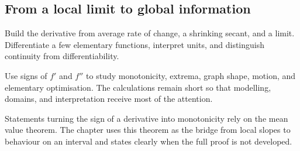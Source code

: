 \subsection{From a local limit to global information}

\begin{corebox}
Build the derivative from average rate of change, a shrinking secant, and a limit. Differentiate a few elementary functions, interpret units, and distinguish continuity from differentiability.
\end{corebox}

\begin{corebox}
Use signs of $f'$ and $f''$ to study monotonicity, extrema, graph shape, motion, and elementary optimisation. The calculations remain short so that modelling, domains, and interpretation receive most of the attention.
\end{corebox}

Statements turning the sign of a derivative into monotonicity rely on the mean value theorem. The chapter uses this theorem as the bridge from local slopes to behaviour on an interval and states clearly when the full proof is not developed.
